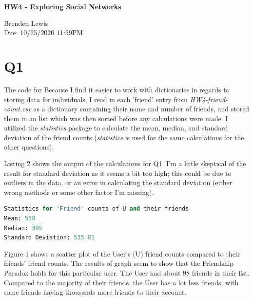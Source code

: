\documentclass[12pt]{article}
\begin{document}
\begin{centering}
{\large\textbf{HW4 - Exploring Social Networks}}

Brenden Lewis\\                     
Due: 10/25/2020 11:59PM\\                      
\end{centering}

\section*{Q1}

The code for Because I find it easier to work with dictionaries in regards to storing data for individuals, I read in each 'friend' entry from \emph{HW4-friend-count.csv} as a dictionary containing their name and number of friends, and stored them in an list which was then sorted before any calculations were made. I utilized the \emph{statistics} package to calculate the mean, median, and standard deviation of the friend counts (\emph{statistics} is used for the same calculations for the other questions).



\par Listing 2 shows the output of the calculations for Q1. I'm a little skeptical of the result for standard deviation as it seems a bit too high; this could be due to outliers in the data, or an error in calculating the standard deviation (either wrong methods or some other factor I'm missing).

\begin{lstlisting}[language=Python, caption={Calculated mean, median, and standard deviation for Q1}, label=lst:copy]
Statistics for 'Friend' counts of U and their friends
Mean: 538
Median: 395
Standard Deviation: 535.81
\end{lstlisting}

\par Figure 1 shows a scatter plot of the User's (U) friend counts compared to their friends' friend counts. The results of graph seem to show that the Friendship Paradox holds for this particular user. The User had about 98 friends in their list. Compared to the majority of their friends, the User has a lot less friends, with some friends having thousands more friends to their account.
\end{document}
